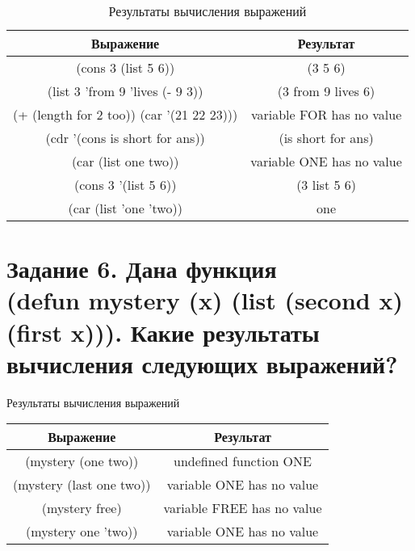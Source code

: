 \begin{center}
	\captionsetup{justification=raggedright,singlelinecheck=off}
	\begin{longtable}[c]{|c|c|}
		\caption{\label{5}Результаты вычисления выражений}\\
		\hline
		Выражение & Результат \\
		\hline
		(cons 3 (list 5 6)) & (3 5 6)\\
		\hline
		(list 3 'from 9 'lives (- 9 3)) & (3 from 9 lives 6)\\
		\hline
		(+ (length for 2 too)) (car '(21 22 23))) & variable FOR has no value\\
		\hline
		(cdr '(cons is short for ans)) & (is short for ans)\\
		\hline
		(car (list one two)) & variable ONE has no value\\
		\hline
		(cons 3 '(list 5 6)) & (3 list 5 6)\\
		\hline
		(car (list 'one 'two)) & one\\
		\hline
	\end{longtable}
\end{center}

\section{Задание 6. Дана функция\\(defun mystery (x) (list (second x) (first x))). Какие результаты вычисления следующих выражений?}

\begin{center}
	\begin{threeparttable}
		\captionsetup{justification=raggedright,singlelinecheck=off}
		\caption{\label{6}Результаты вычисления выражений}
		\centering
		\begin{tabular}{|c|c|}
			\hline
			Выражение & Результат\\
			\hline
			(mystery (one two)) & undefined function ONE\\
			\hline
			(mystery (last one two)) & variable ONE has no value\\
			\hline
			(mystery free) & variable FREE has no value\\
			\hline
			(mystery one 'two)) & variable ONE has no value\\
			\hline
		\end{tabular}
	\end{threeparttable}
\end{center}

